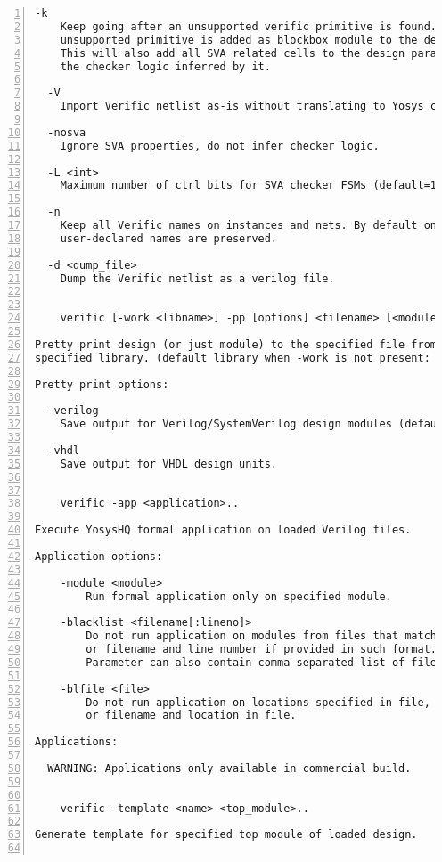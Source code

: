 \begin{lstlisting}[numbers=left,frame=single]
  -k
    Keep going after an unsupported verific primitive is found. The
    unsupported primitive is added as blockbox module to the design.
    This will also add all SVA related cells to the design parallel to
    the checker logic inferred by it.

  -V
    Import Verific netlist as-is without translating to Yosys cell types. 

  -nosva
    Ignore SVA properties, do not infer checker logic.

  -L <int>
    Maximum number of ctrl bits for SVA checker FSMs (default=16).

  -n
    Keep all Verific names on instances and nets. By default only
    user-declared names are preserved.

  -d <dump_file>
    Dump the Verific netlist as a verilog file.


    verific [-work <libname>] -pp [options] <filename> [<module>]..

Pretty print design (or just module) to the specified file from the
specified library. (default library when -work is not present: "work")

Pretty print options:

  -verilog
    Save output for Verilog/SystemVerilog design modules (default).

  -vhdl
    Save output for VHDL design units.


    verific -app <application>..

Execute YosysHQ formal application on loaded Verilog files.

Application options:

    -module <module>
        Run formal application only on specified module.

    -blacklist <filename[:lineno]>
        Do not run application on modules from files that match the filename
        or filename and line number if provided in such format.
        Parameter can also contain comma separated list of file locations.

    -blfile <file>
        Do not run application on locations specified in file, they can represent filename
        or filename and location in file.

Applications:

  WARNING: Applications only available in commercial build.


    verific -template <name> <top_module>..

Generate template for specified top module of loaded design.


\end{lstlisting}
